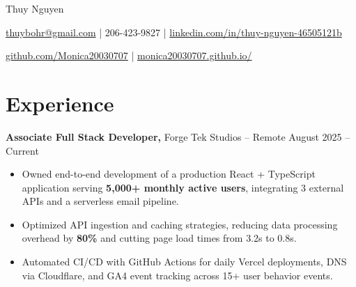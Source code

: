 \documentclass[11pt]{article}       %
\begin{document}
\centerline{\Huge Thuy Nguyen}

\vspace{5pt}

\centerline{\href{mailto:thuybohr@gmail.com}{thuybohr@gmail.com} | 206-423-9827 |
\href{https://www.linkedin.com/in/thuy-nguyen-46505121b}{linkedin.com/in/thuy-nguyen-46505121b}}

\centerline{\href{https://github.com/Monica20030707}{github.com/Monica20030707} | 
\href{https://monica20030707.github.io/}{monica20030707.github.io/}} 

\vspace{-9pt}

\section*{Experience}

\textbf{Associate Full Stack Developer,} {Forge Tek Studios} -- Remote \hfill August 2025 -- Current \\
\vspace{-9pt}
\begin{itemize}
  \item Owned end-to-end development of a production React + TypeScript application serving \textbf{5,000+ monthly active users}, integrating 3 external APIs and a serverless email pipeline.
  \item Optimized API ingestion and caching strategies, reducing data processing overhead by \textbf{80\%} and cutting page load times from 3.2s to 0.8s.
  \item Automated CI/CD with GitHub Actions for daily Vercel deployments, DNS via Cloudflare, and GA4 event tracking across 15+ user behavior events.
\end{itemize}
\end{document}
